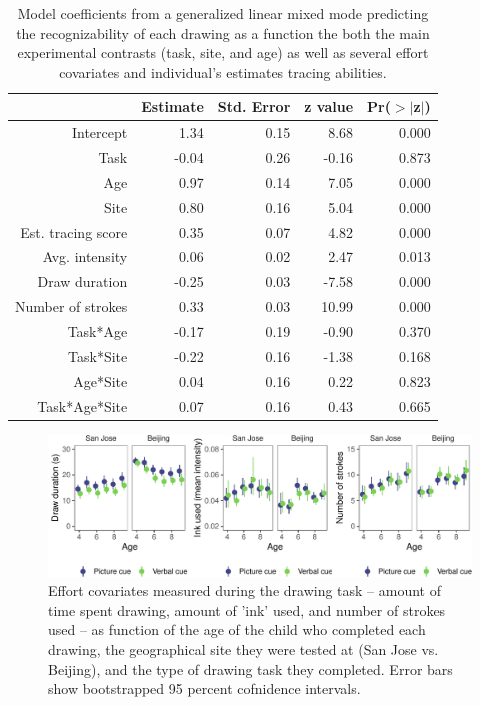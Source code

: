 \documentclass[
  english,
  man]{apa6}
\begin{document}
\begin{table}[ht]
\centering
\begin{tabular}{rrrrr}
  \hline
 & Estimate & Std. Error & z value & Pr($>$$|$z$|$) \\ 
  \hline
Intercept & 1.34 & 0.15 & 8.68 & 0.000 \\ 
  Task & -0.04 & 0.26 & -0.16 & 0.873 \\ 
  Age & 0.97 & 0.14 & 7.05 & 0.000 \\ 
  Site & 0.80 & 0.16 & 5.04 & 0.000 \\ 
  Est. tracing score & 0.35 & 0.07 & 4.82 & 0.000 \\ 
  Avg. intensity & 0.06 & 0.02 & 2.47 & 0.013 \\ 
  Draw duration & -0.25 & 0.03 & -7.58 & 0.000 \\ 
  Number of strokes & 0.33 & 0.03 & 10.99 & 0.000 \\ 
  Task*Age & -0.17 & 0.19 & -0.90 & 0.370 \\ 
  Task*Site & -0.22 & 0.16 & -1.38 & 0.168 \\ 
  Age*Site & 0.04 & 0.16 & 0.22 & 0.823 \\ 
  Task*Age*Site & 0.07 & 0.16 & 0.43 & 0.665 \\ 
   \hline
\end{tabular}
\caption{Model coefficients from a generalized linear mixed mode predicting the recognizability of each drawing as a function the both the main experimental contrasts (task, site, and age) as well as several effort covariates and individual's estimates tracing abilities.} 
\end{table}

\begin{figure}[H]

{\centering \includegraphics[width=\textwidth]{figs/effort-covariates-1} 

}

\caption{Effort covariates measured during the drawing task -- amount of time spent drawing, amount of 'ink' used, and number of strokes used -- as function of the age of the child who completed each drawing, the geographical site they were tested at (San Jose vs. Beijing), and the type of drawing task they completed. Error bars show bootstrapped 95 percent cofnidence intervals.}\label{fig:effort-covariates}
\end{figure}
\end{document}
